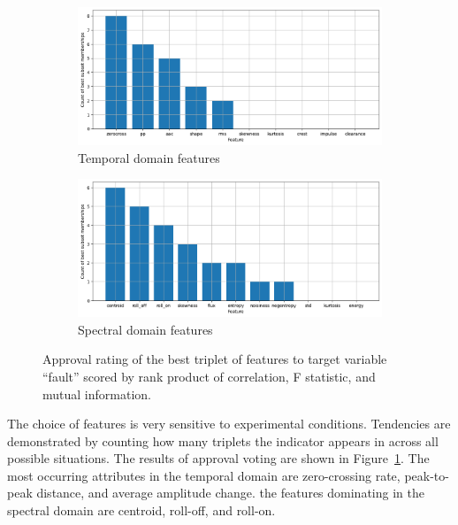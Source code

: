 \begin{figure}[h!]
    \centering
    \begin{subfigure}[b]{0.49\textwidth}
        \includegraphics[width=\textwidth]{assets/design/approval-voting-temporal.png}
        \caption{Temporal domain features}
    \end{subfigure}
    \hfill
    \begin{subfigure}[b]{0.49\textwidth}
        \includegraphics[width=\textwidth]{assets/design/approval-voting-spectral.png}
        \caption{Spectral domain features}
    \end{subfigure}
    \caption{Approval rating of the best triplet of features to target variable ``fault'' scored by rank product of correlation, F statistic, and mutual information.}
    \label{fig:design:approval-rating-features}
\end{figure}

The choice of features is very sensitive to experimental conditions. Tendencies are demonstrated by counting how many triplets the indicator appears in across all possible situations. The results of approval voting are shown in Figure~\ref{fig:design:approval-rating-features}. The most occurring attributes in the temporal domain are zero-crossing rate, peak-to-peak distance, and average amplitude change. the features dominating in the spectral domain are centroid, roll-off, and roll-on.


